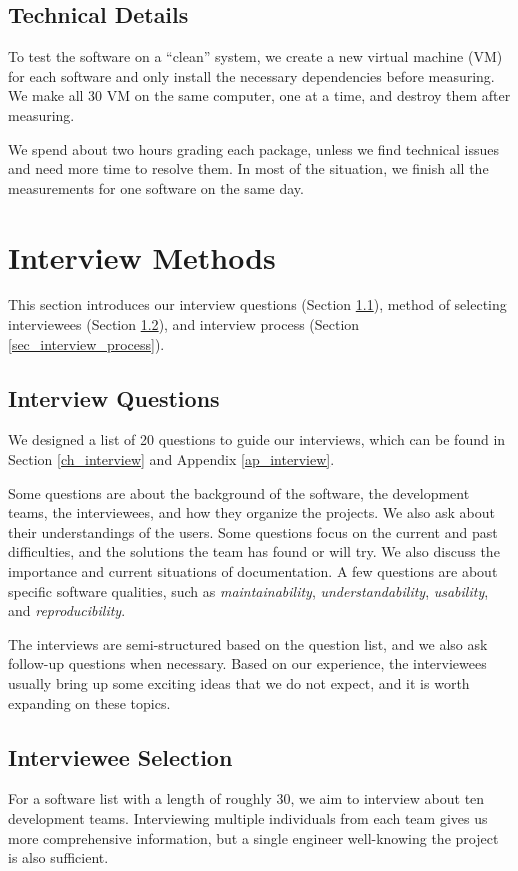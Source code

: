 \subsection{Technical Details}
\label{sec_technical_details}
To test the software on a ``clean'' system, we create a new virtual machine (VM) for each software and only install the necessary dependencies before measuring. We make all 30 VM on the same computer, one at a time, and destroy them after measuring.

We spend about two hours grading each package, unless we find technical issues and need more time to resolve them. In most of the situation, we finish all the measurements for one software on the same day.

\section{Interview Methods}
\label{sec_interview_methods}

This section introduces our interview questions (Section \ref{sec_interview_questions}), method of selecting interviewees (Section \ref{sec_interviewee_selection}), and interview process (Section \ref{sec_interview_process}).

\subsection{Interview Questions}
\label{sec_interview_questions}
We designed a list of 20 questions to guide our interviews, which can be found in Section \ref{ch_interview} and Appendix \ref{ap_interview}.

Some questions are about the background of the software, the development teams, the interviewees, and how they organize the projects. We also ask about their understandings of the users. Some questions focus on the current and past difficulties, and the solutions the team has found or will try. We also discuss the importance and current situations of documentation. A few questions are about specific software qualities, such as \textit{maintainability}, \textit{understandability}, \textit{usability}, and \textit{reproducibility}.

The interviews are semi-structured based on the question list, and we also ask follow-up questions when necessary. Based on our experience, the interviewees usually bring up some exciting ideas that we do not expect, and it is worth expanding on these topics.

\subsection{Interviewee Selection}
\label{sec_interviewee_selection}
For a software list with a length of roughly 30, we aim to interview about ten development teams. Interviewing multiple individuals from each team gives us more comprehensive information, but a single engineer well-knowing the project is also sufficient.

